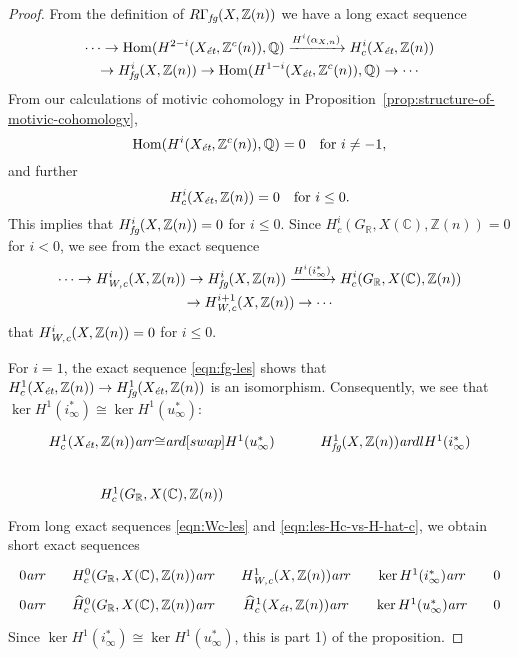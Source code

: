 \documentclass[draft]{article}
\DeclareMathOperator{\Hom}{Hom}
\newcommand{\CC}{\mathbb{C}}
\newcommand{\QQ}{\mathbb{Q}}
\newcommand{\RR}{\mathbb{R}}
\newcommand{\ZZ}{\mathbb{Z}}
\newcommand{\ar}{\text{\it ar}}
\newcommand{\et}{\text{\it \'{e}t}}
\newcommand{\fg}{\text{\it fg}}
\newcommand{\Wc}{\text{\it W,c}}
\theoremstyle{myplain}
\theoremstyle{mydefinition}
\begin{document}
\begin{proof}
  From the definition of $R\Gamma_\fg (X, \ZZ(n))$ we have a long exact
  sequence
  \begin{multline}
    \label{eqn:fg-les}
    \cdots \to \Hom (H^{2-i} (X_\et, \ZZ^c (n)), \QQ) \xrightarrow{H^i (\alpha_{X,n})} H^i_c (X_\et, \ZZ(n)) \\
    \to H^i_\fg (X, \ZZ(n)) \to \Hom (H^{1-i} (X_\et, \ZZ^c (n)), \QQ)
    \to \cdots
  \end{multline}
  From our calculations of motivic cohomology in
  Proposition~\ref{prop:structure-of-motivic-cohomology},
  $$\Hom (H^i (X_\et, \ZZ^c (n)), \QQ) = 0 \quad \text{for }i \ne -1,$$
  and further
  $$H^i_c (X_\et, \ZZ(n)) = 0 \quad \text{for }i \le 0.$$
  This implies that $H^i_\fg (X, \ZZ(n)) = 0$ for $i \le 0$.
  Since $H^i_c (G_\RR, X(\CC), \ZZ(n)) = 0$ for $i < 0$, we see from the exact
  sequence
  \begin{multline}
    \label{eqn:Wc-les}
    \cdots \to H^i_\Wc (X, \ZZ(n)) \to
    H^i_\fg (X,\ZZ(n)) \xrightarrow{H^i (i^*_\infty)}
    H^i_c (G_\RR, X(\CC), \ZZ(n)) \\
    \to H^{i+1}_\Wc (X, \ZZ(n)) \to \cdots
  \end{multline}
  that $H^i_\Wc (X, \ZZ(n)) = 0$ for $i \le 0$.

  \vspace{1em}

  For $i = 1$, the exact sequence \eqref{eqn:fg-les} shows that
  $H^1_c (X_\et, \ZZ(n)) \to H^1_\fg (X_\et, \ZZ(n))$ is an isomorphism.
  Consequently, we see that
  $\ker H^1 (i^*_\infty) \cong \ker H^1 (u_\infty^*)$:
  \[ \begin{tikzcd}
      H^1_c (X_\et, \ZZ(n)) \ar{r}{\cong}\ar{d}[swap]{H^1 (u^*_\infty)} & H^1_\fg (X, \ZZ(n)) \ar{dl}{H^1 (i^*_\infty)} \\
      H^1_c (G_\RR, X(\CC), \ZZ(n))
    \end{tikzcd} \]
  From long exact sequences \eqref{eqn:Wc-les} and
  \eqref{eqn:les-Hc-vs-H-hat-c}, we obtain short exact sequences
  \[ \begin{tikzcd}[column sep=1em,row sep=0pt]
      0 \ar{r} & H^0_c (G_\RR, X(\CC), \ZZ(n)) \ar{r} & H^1_\Wc (X, \ZZ(n)) \ar{r} & \ker H^1 (i^*_\infty) \ar{r} & 0 \\
      0 \ar{r} & \widehat{H}^0_c (G_\RR, X(\CC), \ZZ(n)) \ar{r} & \widehat{H}^1_c (X_\et, \ZZ(n)) \ar{r} & \ker H^1 (u_\infty^*) \ar{r} & 0
    \end{tikzcd} \]
  Since $\ker H^1 (i^*_\infty) \cong \ker H^1 (u_\infty^*)$,
  this is part 1) of the proposition.


\end{proof}
\end{document}
